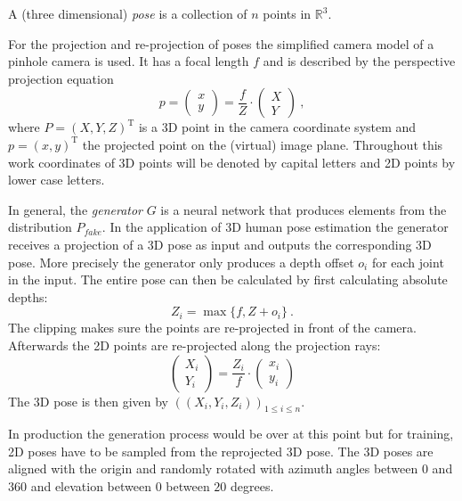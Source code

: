 A (three dimensional) \textit{pose} is a collection of $n$ points in $\mathbb{R}^3$.

For the projection and re-projection of poses the simplified camera model of a pinhole camera is used.
It has a focal length $f$ and is described by the perspective projection equation
\begin{equation}
	\label{eq:perspective-projection}
	p = 
	\begin{pmatrix}
	x\\
	y
	\end{pmatrix}
	= \frac{f}{Z} \cdot 	
	\begin{pmatrix}
	X\\
	Y
	\end{pmatrix} \ ,
\end{equation}
where $P = (X, Y, Z)^\mathrm{T}$ is a 3D point in the camera coordinate system and $p = (x, y)^\mathrm{T}$ the projected point on the (virtual) image plane.
Throughout this work coordinates of 3D points will be denoted by capital letters and 2D points by lower case letters.

In general, the \textit{generator} $G$ is a neural network that produces  elements from the distribution $P_{fake}$.
In the application of 3D human pose estimation the generator receives a projection of a 3D pose as input and outputs the corresponding 3D pose.
More precisely the generator only produces a depth offset $o_i$ for each joint in the input.
The entire pose can then be calculated by first calculating absolute depths:
\begin{equation}
	Z_i = \max \{f, Z + o_i\} \ .
\end{equation}
The clipping makes sure the points are re-projected in front of the camera.
Afterwards the 2D points are re-projected along the projection rays:
\begin{equation}
	\label{eq:perspective-re-projection}
	\begin{pmatrix}
	X_i\\
	Y_i
	\end{pmatrix} = \frac{Z_i}{f} \cdot
	\begin{pmatrix}
	x_i\\
	y_i
	\end{pmatrix}
\end{equation} 
The 3D pose is then given by $\left(\left(X_i, Y_i, Z_i\right)\right)_{1\leq i \leq n}$.

In production the generation process would be over at this point but for training, 2D poses have to be sampled from the reprojected 3D pose.
The 3D poses are aligned with the origin and randomly rotated with azimuth angles between $0$ and $360$ and elevation between $0$ between $20$ degrees.


